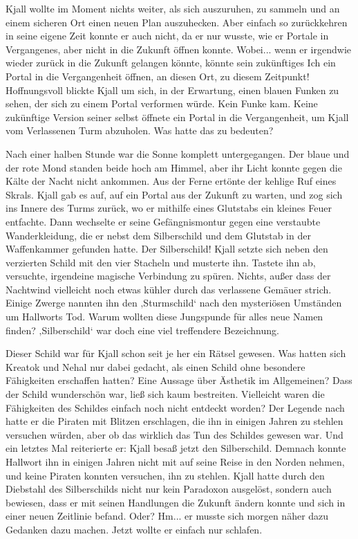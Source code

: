 \documentclass[10pt, a4paper, oneside]{book}
\begin{document}
Kjall wollte im Moment nichts weiter, als sich auszuruhen, zu sammeln und an einem sicheren Ort einen neuen Plan auszuhecken. Aber einfach so zurückkehren in seine eigene Zeit konnte er auch nicht, da er nur wusste, wie er Portale in Vergangenes, aber nicht in die Zukunft öffnen konnte. Wobei... wenn er irgendwie wieder zurück in die Zukunft gelangen könnte, könnte sein zukünftiges Ich ein Portal in die Vergangenheit öffnen, an diesen Ort, zu diesem Zeitpunkt! Hoffnungsvoll blickte Kjall um sich, in der Erwartung, einen blauen Funken zu sehen, der sich zu einem Portal verformen würde. Kein Funke kam. Keine zukünftige Version seiner selbst öffnete ein Portal in die Vergangenheit, um Kjall vom Verlassenen Turm abzuholen. Was hatte das zu bedeuten?

Nach einer halben Stunde war die Sonne komplett untergegangen. Der blaue und der rote Mond standen beide hoch am Himmel, aber ihr Licht konnte gegen die Kälte der Nacht nicht ankommen. Aus der Ferne ertönte der kehlige Ruf eines Skrals. Kjall gab es auf, auf ein Portal aus der Zukunft zu warten, und zog sich ins Innere des Turms zurück, wo er mithilfe eines Glutstabs ein kleines Feuer entfachte. Dann wechselte er seine Gefängnismontur gegen eine verstaubte Wanderkleidung, die er nebst dem Silberschild und dem Glutstab in der Waffenkammer gefunden hatte. Der Silberschild! Kjall setzte sich neben den verzierten Schild mit den vier Stacheln und musterte ihn. Tastete ihn ab, versuchte, irgendeine magische Verbindung zu spüren. Nichts, außer dass der Nachtwind vielleicht noch etwas kühler durch das verlassene Gemäuer strich. Einige Zwerge nannten ihn den ‚Sturmschild‘ nach den mysteriösen Umständen um Hallworts Tod. Warum wollten diese Jungspunde für alles neue Namen finden? ‚Silberschild‘ war doch eine viel treffendere Bezeichnung.

Dieser Schild war für Kjall schon seit je her ein Rätsel gewesen. Was hatten sich Kreatok und Nehal nur dabei gedacht, als einen Schild ohne besondere Fähigkeiten erschaffen hatten? Eine Aussage über Ästhetik im Allgemeinen? Dass der Schild wunderschön war, ließ sich kaum bestreiten. Vielleicht waren die Fähigkeiten des Schildes einfach noch nicht entdeckt worden? Der Legende nach hatte er die Piraten mit Blitzen erschlagen, die ihn in einigen Jahren zu stehlen versuchen würden, aber ob das wirklich das Tun des Schildes gewesen war. Und ein letztes Mal reiterierte er: Kjall besaß jetzt den Silberschild. Demnach konnte Hallwort ihn in einigen Jahren nicht mit auf seine Reise in den Norden nehmen, und keine Piraten konnten versuchen, ihn zu stehlen. Kjall hatte durch den Diebstahl des Silberschilds nicht nur kein Paradoxon ausgelöst, sondern auch bewiesen, dass er mit seinen Handlungen die Zukunft ändern konnte und sich in einer neuen Zeitlinie befand. Oder? Hm... er musste sich morgen näher dazu Gedanken dazu machen. Jetzt wollte er einfach nur schlafen.
\end{document}
